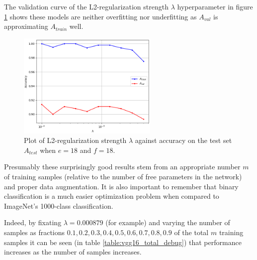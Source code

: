 The validation curve of the L2-regularization strength $\lambda$ hyperparameter in figure \ref{fig:vgg16_total_lambda} shows these models are neither overfitting nor underfitting as $A_{val}$ is approximating $A_{train}$ well.

\begin{figure}[ht]
    \centering
    \includegraphics[width=0.6\textwidth]{figs/vgg16_total_lambda.png}
    \caption{Plot of L2-regularization strength $\lambda$ against accuracy on the test set $A_{test}$ when $e = 18$ and $f = 18$.}
    \label{fig:vgg16_total_lambda}
\end{figure}

Presumably these surprisingly good results stem from an appropriate number $m$ of training samples (relative to the number of free parameters in the network) and proper data augmentation. It is also important to remember that binary classification is a much easier optimization problem when compared to ImageNet's 1000-class classification.

Indeed, by fixating $\lambda = 0.000879$ (for example) and varying the number of samples as fractions ${0.1, 0.2, 0.3, 0.4, 0.5, 0.6, 0.7, 0.8, 0.9}$ of the total $m$ training samples it can be seen (in table \ref{table:vgg16_total_debug}) that performance increases as the number of samples increases.


